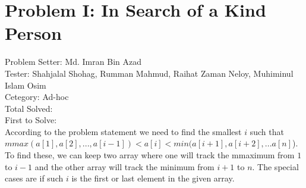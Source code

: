 \section*{Problem I: In Search of a Kind Person}
Problem Setter: Md. Imran Bin Azad \\
Tester: Shahjalal Shohag, Rumman Mahmud, Raihat Zaman Neloy, Muhiminul Islam Osim \\
Cetegory: Ad-hoc \\
Total Solved:  \\
First to Solve: \\

According to the problem statement we need to find the smallest $i$ such that
$mmax(a[1], a[2], ... , a[i-1]) < a[i] < min(a[i+1], a[i+2], ... a[n]$). To find
these, we can keep two array where one will track the mmaximum from $1$ to $i-1$
and the other array will track the minimum from $i+1$ to $n$. The special cases
are if such $i$ is the first or last element in the given array.